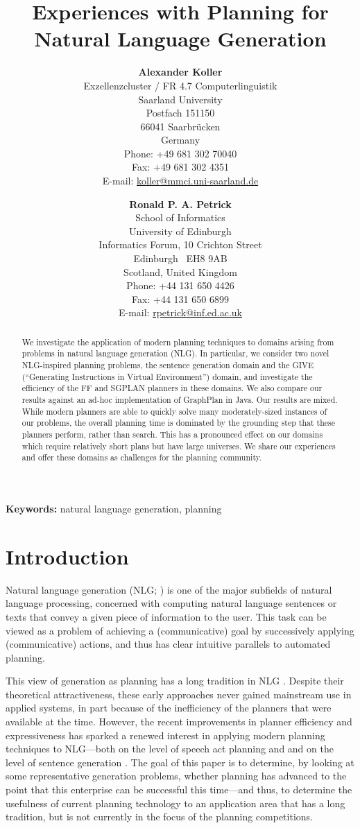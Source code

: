 \documentclass[letterpaper]{article}
\title{Experiences with Planning for Natural Language Generation}
\author{\textbf{Alexander Koller} \\
Exzellenzcluster / FR 4.7 Computerlinguistik \\
Saarland University \\
Postfach 151150 \\
66041 Saarbr\"ucken \\
Germany \\
Phone: +49 681 302 70040 \\
Fax: +49 681 302 4351 \\
E-mail: \url{koller@mmci.uni-saarland.de}
\and
\textbf{Ronald P. A. Petrick} \\
School of Informatics \\
University of Edinburgh \\
Informatics Forum, 10 Crichton Street \\
Edinburgh \ EH8 9AB \\
Scotland, United Kingdom \\
Phone: +44 131 650 4426 \\
Fax: +44 131 650 6899 \\
E-mail: \url{rpetrick@inf.ed.ac.uk}}
\date{}
\begin{document}
\maketitle


\pagebreak
\begin{abstract}
We investigate the application of modern planning techniques to domains
arising from problems in natural language generation (NLG). In particular,
we consider two novel NLG-inspired planning problems, the sentence
generation domain and the GIVE (``Generating Instructions in Virtual
Environment'') domain, and investigate the efficiency of the FF and SGPLAN
planners in these domains. We also compare our results against an ad-hoc
implementation of GraphPlan in Java. Our results are mixed. While modern
planners are able to quickly solve many moderately-sized instances of our
problems, the overall planning time is dominated by the grounding step that
these planners perform, rather than search. This has a pronounced effect on
our domains which require relatively short plans but have large universes.
We share our experiences and offer these domains as challenges for the
planning community.
\end{abstract}

\bigskip\noindent
\textbf{Keywords:} natural language generation, planning


\pagebreak
\section{Introduction}
\label{sec:introduction}

Natural language generation (NLG; \citealp{reiter00building}) is one
of the major subfields of natural language processing, concerned with
computing natural language sentences or texts that convey a given
piece of information to the user. This task can be viewed as a problem
of achieving a (communicative) goal by successively applying
(communicative) actions, and thus has clear intuitive parallels to
automated planning.

This view of generation as planning has a long tradition in NLG
\citep{perrault80,appelt:planning,hovy88,young94dpocl}. Despite their
theoretical attractiveness, these early approaches never gained
mainstream use in applied systems, in part because of the inefficiency
of the planners that were available at the time. However, the recent
improvements in planner efficiency and expressiveness has sparked a
renewed interest in applying modern planning techniques to NLG---both
on the level of speech act planning
\citep{Steedman-Petrick:07,benotti08b} and and on the level of
sentence generation \citep{KolSto07}. The goal of this paper is to
determine, by looking at some representative generation problems,
whether planning has advanced to the point that this enterprise can be
successful this time---and thus, to determine the usefulness of
current planning technology to an application area that has a long
tradition, but is not currently in the focus of the planning
competitions.
\end{document}
